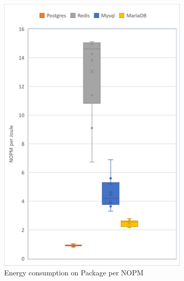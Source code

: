 \begin{figure}[!ht]
        \centering
        \begin{subfigure}[b]{0.32\textwidth}
            \centering
			\includegraphics[width=1\columnwidth]{results/boxplot/Packgage-nopm.png}
			\caption[]%
            {{\small Energy consumption on Package per NOPM}}    
			\label{fig:bocplotnopmpackage}
        \end{subfigure}
        \begin{subfigure}[b]{0.32\textwidth}  
            \centering 

\end{subfigure}
\end{figure}

